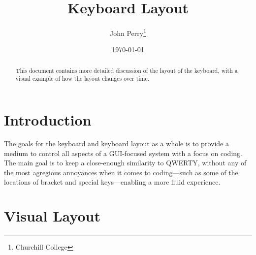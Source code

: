 \documentclass[11pt,a4paper]{article}
\title{Keyboard Layout}
\author{John Perry\thanks{Churchill College}}
\date{\today}
\numberwithin{equation}{section}
\begin{document}
\pagestyle{empty}

\maketitle

\pagestyle{fancy}


\begin{abstract}
    This document contains more detailed discussion of the layout of the keyboard, with a visual example of how the layout changes over time.
\end{abstract}

\section{Introduction}

The goals for the keyboard and keyboard layout as a whole is to provide a medium to control all aspects of a GUI-focused system with a focus on coding. The main goal is to keep a close-enough similarity to \textsc{QWERTY}, without any of the most agregious annoyances when it comes to coding---such as some of the locations of bracket and special keys---enabling a more fluid experience.

\section{Visual Layout}
\end{document}
